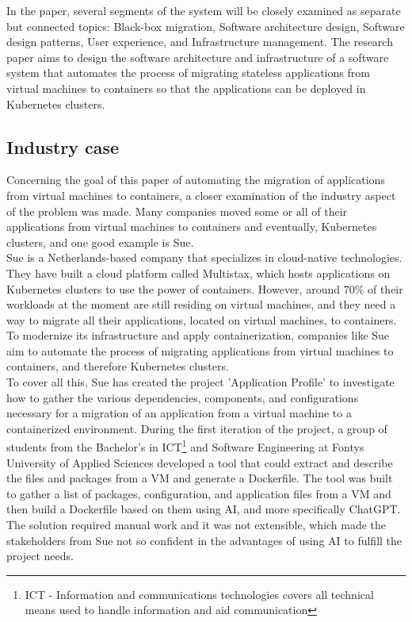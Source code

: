 \documentclass[twocolumn]{article}
\begin{document}
In the paper, several segments of the system will be closely examined as separate but connected topics: Black-box migration, Software architecture design, Software design patterns, User experience, and Infrastructure management. The research paper aims to design the software architecture and infrastructure of a software system that automates the process of migrating stateless applications from virtual machines to containers so that the applications can be deployed in Kubernetes clusters.

\subsection{Industry case}
Concerning the goal of this paper of automating the migration of applications from virtual machines to containers, a closer examination of the industry aspect of the problem was made. Many companies moved some or all of their applications from virtual machines to containers and eventually, Kubernetes clusters, and one good example is Sue. \\

Sue is a Netherlands-based company that specializes in cloud-native technologies. They have built a cloud platform called Multistax, which hosts applications on Kubernetes clusters to use the power of containers. However, around 70\% of their workloads at the moment are still residing on virtual machines, and they need a way to migrate all their applications, located on virtual machines, to containers. To modernize its infrastructure and apply containerization, companies like Sue aim to automate the process of migrating applications from virtual machines to containers, and therefore Kubernetes clusters. \\

To cover all this, Sue has created the project 'Application Profile' to investigate how to gather the various dependencies, components, and configurations necessary for a migration of an application from a virtual machine to a containerized environment. During the first iteration of the project, a group of students from the Bachelor’s in ICT\footnote{ICT - Information and communications technologies covers all technical means used to handle information and aid communication} and Software Engineering at Fontys University of Applied Sciences developed a tool that could extract and describe the files and packages from a VM and generate a Dockerfile. The tool was built to gather a list of packages, configuration, and application files from a VM and then build a Dockerfile based on them using AI, and more specifically ChatGPT. The solution required manual work and it was not extensible, which made the stakeholders from Sue not so confident in the advantages of using AI to fulfill the project needs. \\
\end{document}

